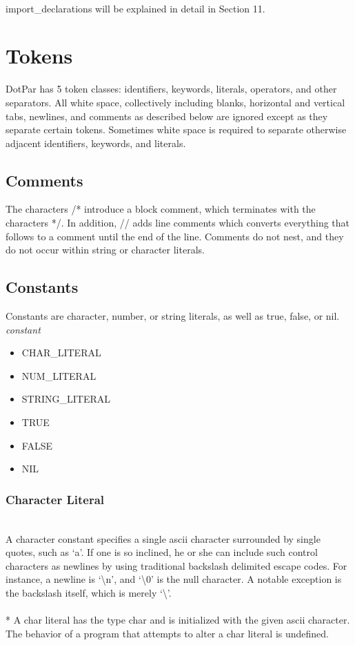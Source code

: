 \documentclass[11pt]{article}
\begin{document}
\\
\newline import\_declarations will be explained in detail in Section 11.

\section{Tokens}
DotPar has 5 token classes: identifiers, keywords, literals, operators, and other separators. All white space, collectively including blanks, horizontal and vertical tabs, newlines, and comments as described below are ignored except as they separate certain tokens. Sometimes white space is required to separate otherwise adjacent identifiers, keywords, and literals.
\subsection{Comments}
The characters /* introduce a block comment, which terminates with the characters */. In addition, // adds line comments which converts everything that follows to a comment until the end of the line. Comments do not nest, and they do not occur within string or character literals.
\subsection{Constants}
Constants are character, number, or string literals, as well as true, false, or nil.
\\ \emph{constant}
\begin{itemize}
\item
CHAR\_LITERAL
\item
NUM\_LITERAL
\item
STRING\_LITERAL
\item
TRUE
\item
FALSE
\item
NIL
\end{itemize}
\subsubsection{Character Literal}
\\ A character constant specifies a single ascii character surrounded by single quotes, such as `a'. If one is so inclined, he or she can include such control characters as newlines by using traditional backslash delimited escape codes. For instance, a newline is `\textbackslash n', and `\textbackslash 0' is the null character. A notable exception is the backslash itself, which is merely `\textbackslash'.
\\ \\* A char literal has the type char and is initialized with the given ascii character. The behavior of a program that attempts to alter a char literal is undefined.
\end{document}
